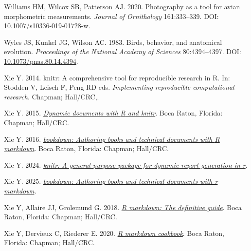 \documentclass[10pt,a4paper]{article}
\newlength{\cslhangindent}
\newenvironment{CSLReferences}[2] %
 {\begin{list}{}{%
  \setlength{\itemindent}{0pt}
  \setlength{\leftmargin}{0pt}
  \setlength{\parsep}{0pt}
  \ifodd #1
   \setlength{\leftmargin}{\cslhangindent}
   \setlength{\itemindent}{-1\cslhangindent}
  \fi
  \setlength{\itemsep}{#2\baselineskip}}}
 {\end{list}}
\begin{document}
\begin{CSLReferences}{1}{0}
Williams HM, Wilcox SB, Patterson AJ. 2020. Photography as a tool for avian morphometric measurements. \emph{Journal of Ornithology} 161:333--339. DOI: \href{https://doi.org/10.1007/s10336-019-01728-w}{10.1007/s10336-019-01728-w}.

Wyles JS, Kunkel JG, Wilson AC. 1983. Birds, behavior, and anatomical evolution. \emph{Proceedings of the National Academy of Sciences} 80:4394--4397. DOI: \href{https://doi.org/10.1073/pnas.80.14.4394}{10.1073/pnas.80.14.4394}.

Xie Y. 2014. {knitr}: A comprehensive tool for reproducible research in {R}. In: Stodden V, Leisch F, Peng RD eds. \emph{Implementing reproducible computational research}. Chapman; Hall/CRC,.

Xie Y. 2015. \emph{\href{https://yihui.org/knitr/}{Dynamic documents with {R} and knitr}}. Boca Raton, Florida: Chapman; Hall/CRC.

Xie Y. 2016. \emph{\href{https://bookdown.org/yihui/bookdown}{{bookdown}: Authoring books and technical documents with {R} markdown}}. Boca Raton, Florida: Chapman; Hall/CRC.

Xie Y. 2024. \emph{\href{https://yihui.org/knitr/}{{knitr}: A general-purpose package for dynamic report generation in r}}.

Xie Y. 2025. \emph{\href{https://github.com/rstudio/bookdown}{{bookdown}: Authoring books and technical documents with r markdown}}.

Xie Y, Allaire JJ, Grolemund G. 2018. \emph{\href{https://bookdown.org/yihui/rmarkdown}{R markdown: The definitive guide}}. Boca Raton, Florida: Chapman; Hall/CRC.

Xie Y, Dervieux C, Riederer E. 2020. \emph{\href{https://bookdown.org/yihui/rmarkdown-cookbook}{R markdown cookbook}}. Boca Raton, Florida: Chapman; Hall/CRC.

\end{CSLReferences}
\end{document}

